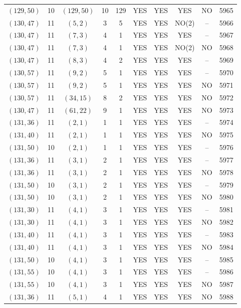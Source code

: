 \begin{longtable}{|c|c|c|c|c|c|c|c|c|c|}
$(129, 50)$ & 10 & $(129, 50)$ & 10 & 129 & YES & YES & YES & NO & 5965\\
$(130, 47)$ & 11 & $(5, 2)$ & 3 & 5 & YES & YES & NO(2) & -- & 5966\\
$(130, 47)$ & 11 & $(7, 3)$ & 4 & 1 & YES & YES & YES & -- & 5967\\
$(130, 47)$ & 11 & $(7, 3)$ & 4 & 1 & YES & YES & NO(2) & NO & 5968\\
$(130, 47)$ & 11 & $(8, 3)$ & 4 & 2 & YES & YES & YES & -- & 5969\\
$(130, 57)$ & 11 & $(9, 2)$ & 5 & 1 & YES & YES & YES & -- & 5970\\
$(130, 57)$ & 11 & $(9, 2)$ & 5 & 1 & YES & YES & YES & NO & 5971\\
$(130, 57)$ & 11 & $(34, 15)$ & 8 & 2 & YES & YES & YES & NO & 5972\\
$(130, 47)$ & 11 & $(61, 22)$ & 9 & 1 & YES & YES & YES & NO & 5973\\
$(131, 36)$ & 11 & $(2, 1)$ & 1 & 1 & YES & YES & YES & -- & 5974\\
$(131, 40)$ & 11 & $(2, 1)$ & 1 & 1 & YES & YES & YES & NO & 5975\\
$(131, 50)$ & 10 & $(2, 1)$ & 1 & 1 & YES & YES & YES & -- & 5976\\
$(131, 36)$ & 11 & $(3, 1)$ & 2 & 1 & YES & YES & YES & -- & 5977\\
$(131, 36)$ & 11 & $(3, 1)$ & 2 & 1 & YES & YES & YES & NO & 5978\\
$(131, 50)$ & 10 & $(3, 1)$ & 2 & 1 & YES & YES & YES & -- & 5979\\
$(131, 50)$ & 10 & $(3, 1)$ & 2 & 1 & YES & YES & YES & NO & 5980\\
$(131, 30)$ & 11 & $(4, 1)$ & 3 & 1 & YES & YES & YES & -- & 5981\\
$(131, 30)$ & 11 & $(4, 1)$ & 3 & 1 & YES & YES & YES & NO & 5982\\
$(131, 40)$ & 11 & $(4, 1)$ & 3 & 1 & YES & YES & YES & -- & 5983\\
$(131, 40)$ & 11 & $(4, 1)$ & 3 & 1 & YES & YES & YES & NO & 5984\\
$(131, 50)$ & 10 & $(4, 1)$ & 3 & 1 & YES & YES & YES & -- & 5985\\
$(131, 55)$ & 10 & $(4, 1)$ & 3 & 1 & YES & YES & YES & -- & 5986\\
$(131, 55)$ & 10 & $(4, 1)$ & 3 & 1 & YES & YES & YES & NO & 5987\\
$(131, 36)$ & 11 & $(5, 1)$ & 4 & 1 & YES & YES & YES & NO & 5988\\

\end{longtable}
